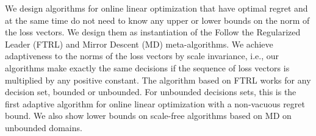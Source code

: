 We design algorithms for online linear optimization that have optimal regret
and at the same time do not need to know any upper or lower bounds on the norm
of the loss vectors. We design them as instantiation of the Follow the Regularized Leader (FTRL) and Mirror Descent (MD) meta-algorithms.
We achieve adaptiveness to the norms of the loss vectors
by scale invariance, i.e., our algorithms make exactly the same decisions if
the sequence of loss vectors is multiplied by any positive constant.  The algorithm based on FTRL works for any decision set, bounded or unbounded.  For unbounded decisions sets, this is the first adaptive algorithm for online linear
optimization with a non-vacuous regret bound.
We also show lower bounds on scale-free algorithms based on MD on unbounded domains.
